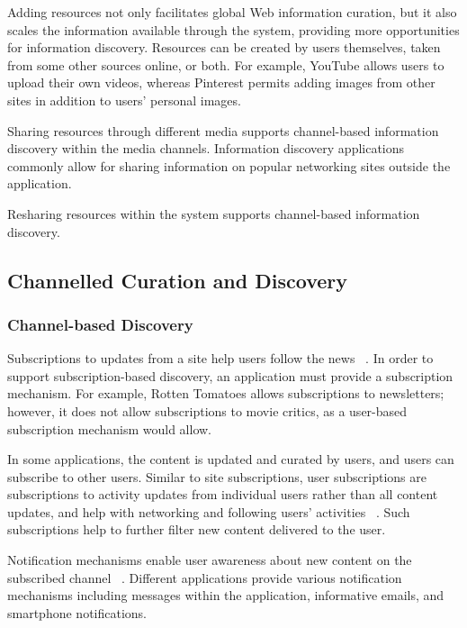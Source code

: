 {{{Adding resources not only facilitates global Web information curation, but it also scales the information available through the system, providing more opportunities for information discovery. Resources can be created by users themselves, taken from some other sources online, or both. For example, YouTube allows users to upload their own videos, whereas Pinterest permits adding images from other sites in addition to users' personal images. 

Sharing resources through different media supports channel-based information discovery within the media channels. Information discovery applications commonly allow for sharing information on popular networking sites outside the application.

Resharing resources within the system supports channel-based information discovery. 
} %



} %


{\subsection{Channelled Curation and Discovery}

{\subsubsection{Channel-based Discovery}

Subscriptions to updates from a site help users follow the news ~\cite{java}. In order to support subscription-based discovery, an application must provide a subscription mechanism. For example, Rotten Tomatoes allows subscriptions to newsletters; however, it does not allow subscriptions to movie critics, as a user-based subscription mechanism would allow. 

In some applications, the content is updated and curated by users, and users can subscribe to other users. Similar to site subscriptions, user subscriptions are subscriptions to activity updates from individual users rather than all content updates, and help with networking and following users' activities ~\cite{millen}. Such subscriptions help to further filter new content delivered to the user. 

Notification mechanisms enable user awareness about new content on the subscribed channel ~\cite{millen}. Different applications provide various notification mechanisms including messages within the application, informative emails, and smartphone notifications.

}}}
